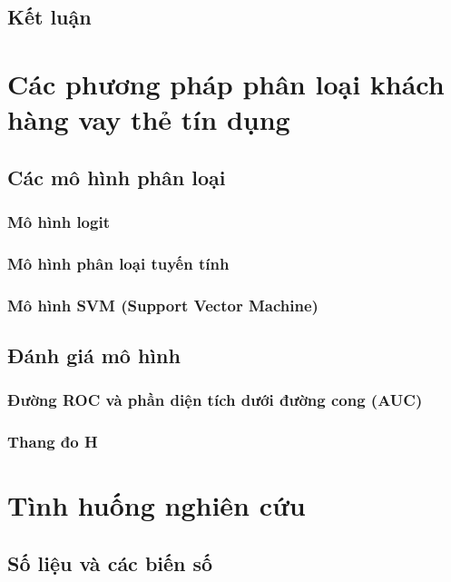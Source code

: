\documentclass[a4paper]{report}\usepackage[]{graphicx}\usepackage[]{color}
\begin{document}
\section{Kết luận}


\chapter{Các phương pháp phân loại khách hàng vay thẻ tín dụng}
\section{Các mô hình phân loại}

\subsection{Mô hình logit}

\subsection{Mô hình phân loại tuyến tính}
\subsection{Mô hình SVM (Support Vector Machine)}

\section{Đánh giá mô hình}
\subsection{Đường ROC và phần diện tích dưới đường cong (AUC)}
\subsection{Thang đo H}


\chapter{Tình huống nghiên cứu}

\section{Số liệu và các biến số}
\end{document}
